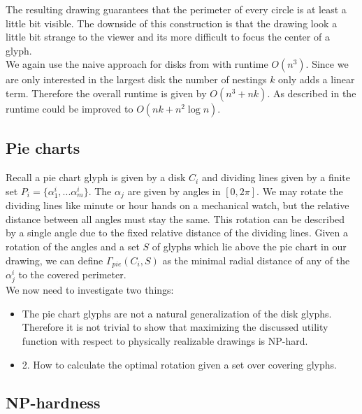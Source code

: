 \documentclass[a4paper,11pt]{article}
\begin{document}
The resulting drawing guarantees that the perimeter of every circle is at least a little bit visible. The downside of this construction is that the drawing look a little bit strange to the viewer and its more difficult to focus the center of a glyph. \\

We again use the naive approach for disks from \cite{caballo} with runtime $O(n^3)$. Since we are only interested in the largest disk the number of nestings $k$ only adds a linear term. Therefore the overall runtime is given by $O(n^3+nk)$. As described in \cite{caballo} the runtime could be improved to $O(nk+n^2 \log n)$.



\subsection{Pie charts}

Recall a pie chart glyph is given by a disk $C_i$ and dividing lines given by a finite set $P_i= \{\alpha_1^i,...\alpha_m^i\}$. The $\alpha_j$ are given by angles in $[0,2\pi ]$. We may rotate the dividing lines like minute or hour hands on a mechanical watch, but the relative distance between all angles must stay the same. This rotation can be described by a single angle due to the fixed relative distance of the dividing lines. Given a rotation of the angles and a set $S$ of glyphs which lie above the pie chart in our drawing, we can define $\Gamma_{pie}(C_i,S)$ as the minimal radial distance of any of the $\alpha^i_j$ to the covered perimeter. \\

We now need to investigate two things:

\begin{itemize}
  \item The pie chart glyphs are not a natural generalization of the disk glyphs. Therefore it is not trivial to show that maximizing the discussed utility function with respect to physically realizable drawings is NP-hard.
  \item 2. How to calculate the optimal rotation given a set over covering glyphs.
\end{itemize}

\newpage

\subsection{NP-hardness}
\end{document}
